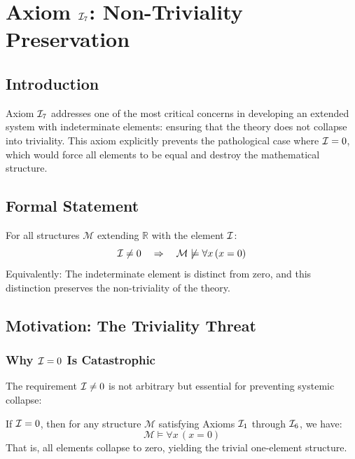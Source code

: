 \chapter{Axiom $\mathcal{I}_7$: Non-Triviality Preservation}
\label{ch:axiom-I7}

\section{Introduction}

Axiom $\mathcal{I}_7$ addresses one of the most critical concerns in developing an extended system with indeterminate elements: ensuring that the theory does not collapse into triviality. This axiom explicitly prevents the pathological case where $\I = 0$, which would force all elements to be equal and destroy the mathematical structure.

\section{Formal Statement}

\begin{axiom}
\label{ax:I7}
For all structures $\mathcal{M}$ extending $\mathbb{R}$ with the element $\mathcal{I}$:
\[
\mathcal{I} \neq 0 \quad \Rightarrow \quad \mathcal{M} \not\models \forall x\, (x = 0)
\]
Equivalently: The indeterminate element is distinct from zero, and this distinction preserves the non-triviality of the theory.
\end{axiom}

\section{Motivation: The Triviality Threat}

\subsection{Why $\I = 0$ Is Catastrophic}

The requirement $\mathcal{I} \neq 0$ is not arbitrary but essential for preventing systemic collapse:

\begin{theorem}[Triviality from $\I = 0$]
\label{thm:I-equals-zero-collapse}
If $\I = 0$, then for any structure $\mathcal{M}$ satisfying Axioms $\mathcal{I}_1$ through $\mathcal{I}_6$, we have:
\[
\mathcal{M} \models \forall x\, (x = 0)
\]
That is, all elements collapse to zero, yielding the trivial one-element structure.
\end{theorem}

